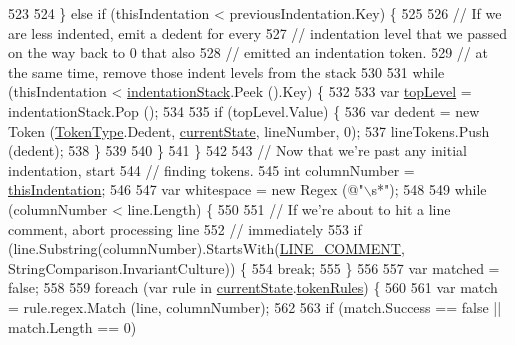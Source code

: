 \begin{DoxyCode}
523 
524             \} \textcolor{keywordflow}{else} \textcolor{keywordflow}{if} (thisIndentation < previousIndentation.Key) \{
525 
526                 \textcolor{comment}{// If we are less indented, emit a dedent for every}
527                 \textcolor{comment}{// indentation level that we passed on the way back to 0 that also}
528                 \textcolor{comment}{// emitted an indentation token.}
529                 \textcolor{comment}{// at the same time, remove those indent levels from the stack}
530 
531                 \textcolor{keywordflow}{while} (thisIndentation < \hyperlink{a00129_a6631a1b1a9109258ab18927e7587ff9b}{indentationStack}.Peek ().Key) \{
532 
533                     var \hyperlink{a00351_a8b7e5c0b2c6870eaa8f9454b4f33678b}{topLevel} = indentationStack.Pop ();
534 
535                     \textcolor{keywordflow}{if} (topLevel.Value) \{
536                         var dedent = \textcolor{keyword}{new} Token (\hyperlink{a00053_a301aa7c866593a5b625a8fc158bbeace}{TokenType}.Dedent, 
      \hyperlink{a00129_ac90b7dce8103425a148f9e8588f14137}{currentState}, lineNumber, 0);
537                         lineTokens.Push (dedent);
538                     \}
539 
540                 \}
541             \}
542 
543             \textcolor{comment}{// Now that we're past any initial indentation, start}
544             \textcolor{comment}{// finding tokens.}
545             \textcolor{keywordtype}{int} columnNumber = \hyperlink{a00351_a0e59365a4aa5811f6495b92a51e23573}{thisIndentation};
546 
547             var whitespace = \textcolor{keyword}{new} Regex (\textcolor{stringliteral}{@"\(\backslash\)s*"});
548 
549             \textcolor{keywordflow}{while} (columnNumber < line.Length) \{
550 
551                 \textcolor{comment}{// If we're about to hit a line comment, abort processing line}
552                 \textcolor{comment}{// immediately}
553                 \textcolor{keywordflow}{if} (line.Substring(columnNumber).StartsWith(\hyperlink{a00129_a29c457125cc4876f8571f5d9afa372e2}{LINE\_COMMENT}, 
      StringComparison.InvariantCulture)) \{
554                     \textcolor{keywordflow}{break};
555                 \}
556 
557                 var matched = \textcolor{keyword}{false};
558 
559                 \textcolor{keywordflow}{foreach} (var rule \textcolor{keywordflow}{in} \hyperlink{a00129_ac90b7dce8103425a148f9e8588f14137}{currentState}.\hyperlink{a00130_adf6563b1dc6f3ef80ed13c2b15b7be03}{tokenRules}) \{
560 
561                     var match = rule.regex.Match (line, columnNumber);
562 
563                     \textcolor{keywordflow}{if} (match.Success == \textcolor{keyword}{false} || match.Length == 0)

\end{DoxyCode}
